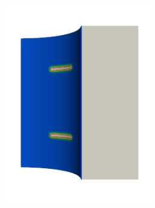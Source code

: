 \begin{frame}
\begin{columns}[T]
\begin{column}{0.6\textwidth}
\begin{figure}
{\begin{subfigure}{0.3\textwidth}
          \end{subfigure}
          \begin{subfigure}{0.3\textwidth}
            \centering
            \includegraphics[width=0.7\textwidth]{Chapter345/figures/seed_d_1}
          \end{subfigure}
        }
        

\end{figure}
\end{column}
\end{columns}
\end{frame}
